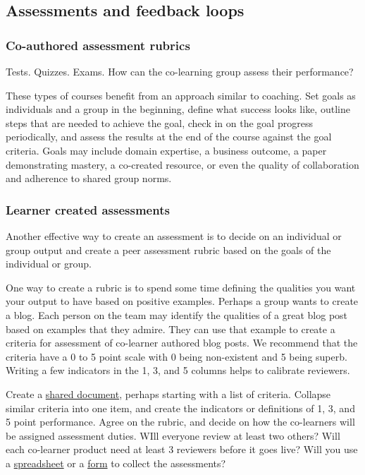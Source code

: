 \subsection{Assessments and feedback loops}

\subsubsection{Co-authored assessment rubrics}

Tests. Quizzes. Exams. How can the co-learning group assess their
performance?

These types of courses benefit from an approach similar to coaching. Set
goals as individuals and a group in the beginning, define what success
looks like, outline steps that are needed to achieve the goal, check in
on the goal progress periodically, and assess the results at the end of
the course against the goal criteria. Goals may include domain
expertise, a business outcome, a paper demonstrating mastery, a
co-created resource, or even the quality of collaboration and adherence
to shared group norms.

\subsubsection{Learner created assessments}

Another effective way to create an assessment is to decide on an
individual or group output and create a peer assessment rubric based on
the goals of the individual or group.

One way to create a rubric is to spend some time defining the qualities
you want your output to have based on positive examples. Perhaps a group
wants to create a blog. Each person on the team may identify the
qualities of a great blog post based on examples that they admire. They
can use that example to create a criteria for assessment of co-learner
authored blog posts. We recommend that the criteria have a 0 to 5 point
scale with 0 being non-existent and 5 being superb. Writing a few
indicators in the 1, 3, and 5 columns helps to calibrate reviewers.

Create a
\href{https://support.google.com/drive/bin/answer.py?hl=en\&answer=143213\&topic=21010\&ctx=topic}{shared
document}, perhaps starting with a list of criteria. Collapse similar
criteria into one item, and create the indicators or definitions of 1,
3, and 5 point performance. Agree on the rubric, and decide on how the
co-learners will be assigned assessment duties. WIll everyone review at
least two others? Will each co-learner product need at least 3 reviewers
before it goes live? Will you use a
\href{https://support.google.com/drive/bin/answer.py?hl=en\&answer=141195\&topic=20329\&ctx=topic}{spreadsheet}
or a
\href{http://support.google.com/drive/bin/answer.py?hl=en\&answer=87809}{form}
to collect the assessments?

